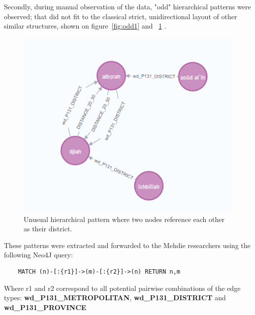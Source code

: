 Secondly, during manual observation of the data, "odd" hierarchical patterns were observed;
that did not fit to the classical strict, unidirectional layout of other similar structures, shown on figure~\ref{fig:odd1} and ~\ref{fig:odd2} .

\begin{figure}[h] %
    \centering %
    \includegraphics[width=0.5\linewidth]{figures/odd2} %
    \caption{Unusual hierarchical pattern where two nodes reference each other as their district.} %
    \label{fig:odd2} %
\end{figure}

These patterns were extracted and forwarded to the Mehdie researchers using the following Neo4J query:
\begin{verbatim}
    MATCH (n)-[:{r1}]->(m)-[:{r2}]->(n) RETURN n,m
\end{verbatim}

Where r1 and r2 correspond to all potential pairwise combinations of the edge types:
\textbf{wd\_P131\_METROPOLITAN}, \textbf{wd\_P131\_DISTRICT} and \textbf{wd\_P131\_PROVINCE}


